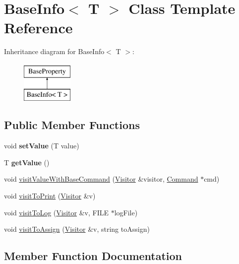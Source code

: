\hypertarget{classBaseInfo}{}\section{Base\+Info$<$ T $>$ Class Template Reference}
\label{classBaseInfo}
Inheritance diagram for Base\+Info$<$ T $>$\+:\begin{figure}[H]
\begin{center}
\leavevmode
\includegraphics[height=2.000000cm]{classBaseInfo}
\end{center}
\end{figure}
\subsection*{Public Member Functions}
\begin{DoxyCompactItemize}
\item 
void {\bfseries set\+Value} (T value)\hypertarget{classBaseInfo_a09e8ede57d2eaad37b868ca2dafce74f}{}\label{classBaseInfo_a09e8ede57d2eaad37b868ca2dafce74f}

\item 
T {\bfseries get\+Value} ()\hypertarget{classBaseInfo_af3590382940cb865a5a8bb59d5d052af}{}\label{classBaseInfo_af3590382940cb865a5a8bb59d5d052af}

\item 
void \hyperlink{classBaseInfo_a84d4e0585478afa4fa067e7485a69159}{visit\+Value\+With\+Base\+Command} (\hyperlink{classVisitor}{Visitor} \&visitor, \hyperlink{classCommand}{Command} $\ast$cmd)
\item 
void \hyperlink{classBaseInfo_a903966b7c9bb3e206b72d7e167d0102a}{visit\+To\+Print} (\hyperlink{classVisitor}{Visitor} \&v)
\item 
void \hyperlink{classBaseInfo_aec2c01b1d1c5a1d8322e4e1c294872d5}{visit\+To\+Log} (\hyperlink{classVisitor}{Visitor} \&v, F\+I\+LE $\ast$log\+File)
\item 
void \hyperlink{classBaseInfo_aab20a2adc240dea5945e0c4340ade696}{visit\+To\+Assign} (\hyperlink{classVisitor}{Visitor} \&v, string to\+Assign)
\end{DoxyCompactItemize}


\subsection{Member Function Documentation}
